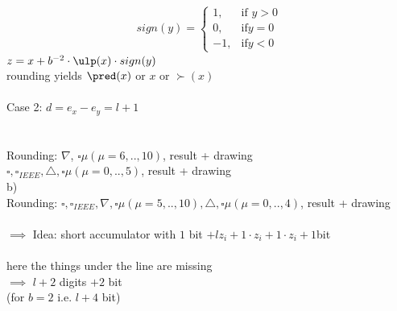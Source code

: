 \begin{itemize}
\begin{enumerate}
\begin{align*}
	sign(y) =
	\begin{cases}
		1, & \text{if } y>0\\
		0,  & \text{if} y=0\\
		-1,  & \text{if} y<0
	\end{cases}
\end{align*}
$z=x+b^{-2}\cdot \ulp(x)\cdot sign(y)$ \\
rounding yields $\pred(x)$ or $x$ or $\succ(x)$\\

\\
Case 2: $d=e_x-e_y=l+1$ \\
 \\
\\
Rounding: $\nabla$, $\square \mu (\mu=6,..,10)$, result + drawing \\
$\square, \square_{IEEE}, \triangle, \square\mu(\mu=0,..,5)$, result + drawing \\ 
b)  \\
Rounding: $\square, \square_{IEEE}, \nabla, \square\mu(\mu=5,..,10), \triangle, \square\mu (\mu=0,..,4)$, result + drawing \\
\\
$\implies$ Idea: short accumulator with $1$ bit $+l z_i+1\cdot z_i+1\cdot z_i+1$bit \\
\\ here the things under the line are missing \\
$\implies$ $l+2$ digits $+2$ bit \\
(for $b=2$ i.e. $l+4$ bit) \\
\end{enumerate}
\end{itemize}

